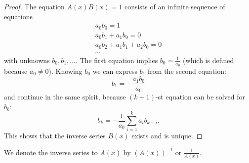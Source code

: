 

\setcounter{section}{2}
\setcounter{subsection}{2}
\setcounter{dfn}{3}

\begin{proof}
The equation $A(x)B(x) = 1$ consists of an infinite sequence of equations
\begin{gather*}
a_0b_0 = 1\\
a_0b_1 + a_1b_0 = 0\\
a_0b_2 + a_1b_1 + a_2b_0 = 0\\
\cdots
\end{gather*}
with unknowns $b_0, b_1, \ldots$.
The first equation implies $b_0 = \frac{1}{a_0}$ (which is defined because $a_0 \ne 0$).
Knowing $b_0$ we can express $b_1$ from the second equation:
\[
b_1 = -\frac{a_1b_0}{a_0}
\]
and continue in the same spirit, because $(k+1)$-st equation can be solved for $b_k$:
\[
b_k = -\frac{1}{a_0}\sum_{i=1}^k a_ib_{k-i}.
\]
This shows that the inverse series $B(x)$ exists and is unique.
\end{proof}

We denote the inverse series to $A(x)$ by $(A(x))^{-1}$ or $\frac{1}{A(x)}$.



